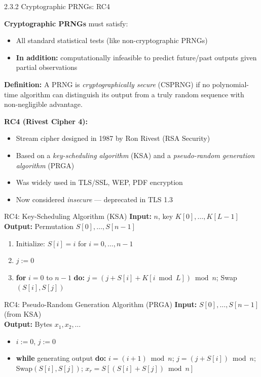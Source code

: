 \documentclass[aspectratio=169,10pt]{beamer}
\begin{document}
\begin{frame}[allowframebreaks]{2.3.2 Cryptographic PRNGs: RC4}

\textbf{Cryptographic PRNGs} must satisfy:
\begin{itemize}
  \item All standard statistical tests (like non-cryptographic PRNGs)
  \item \textbf{In addition:} computationally infeasible to predict future/past
    outputs given partial observations
\end{itemize}

\medskip
\textbf{Definition:} A PRNG is \emph{cryptographically secure} (CSPRNG) if no
polynomial-time algorithm can distinguish its output from a truly random sequence
with non-negligible advantage.

\medskip
\textbf{RC4 (Rivest Cipher 4):}
\begin{itemize}
  \item Stream cipher designed in 1987 by Ron Rivest (RSA Security)
  \item Based on a \emph{key-scheduling algorithm} (KSA) and a
    \emph{pseudo-random generation algorithm} (PRGA)
  \item Was widely used in TLS/SSL, WEP, PDF encryption
  \item Now considered \emph{insecure} --- deprecated in TLS 1.3
\end{itemize}

\framebreak

\begin{block}{RC4: Key-Scheduling Algorithm (KSA)}
\textbf{Input:} $n$, key $K[0],\ldots,K[L-1]$\\
\textbf{Output:} Permutation $S[0],\ldots,S[n-1]$
\begin{enumerate}
  \item Initialize: $S[i] = i$ for $i=0,\ldots,n-1$
  \item $j := 0$
  \item \textbf{for} $i=0$ to $n-1$ \textbf{do:}
  \quad $j = (j + S[i] + K[i \bmod L]) \bmod n$;
  \quad Swap$(S[i], S[j])$
\end{enumerate}
\end{block}

\begin{block}{RC4: Pseudo-Random Generation Algorithm (PRGA)}
\textbf{Input:} $S[0],\ldots,S[n-1]$ (from KSA)\\
\textbf{Output:} Bytes $x_1, x_2, \ldots$
\begin{itemize}
  \item $i := 0$, $j := 0$
  \item \textbf{while} generating output \textbf{do:}
    $i = (i+1) \bmod n$;
    $j = (j + S[i]) \bmod n$;
    Swap$(S[i], S[j])$;
    $x_r = S[(S[i]+S[j]) \bmod n]$
\end{itemize}
\end{block}


\end{frame}
\end{document}
